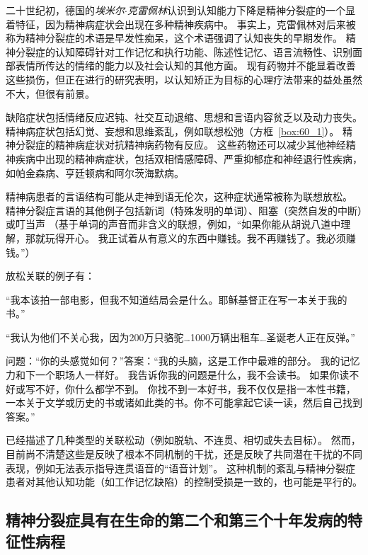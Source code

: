 二十世纪初，德国的\textit{埃米尔$\cdot$克雷佩林}认识到认知能力下降是精神分裂症的一个显着特征，因为精神病症状会出现在多种精神疾病中。
事实上，克雷佩林对后来被称为精神分裂症的术语是早发性痴呆，这个术语强调了认知丧失的早期发作。
精神分裂症的认知障碍针对工作记忆和执行功能、陈述性记忆、语言流畅性、识别面部表情所传达的情绪的能力以及社会认知的其他方面。
现有药物并不能显着改善这些损伤，但正在进行的研究表明，以认知矫正为目标的心理疗法带来的益处虽然不大，但很有前景。


缺陷症状包括情绪反应迟钝、社交互动退缩、思想和言语内容贫乏以及动力丧失。
精神病症状包括幻觉、妄想和思维紊乱，例如联想松弛（方框~\ref{box:60_1}）。
精神分裂症的精神病症状对抗精神病药物有反应。
这些药物还可以减少其他神经精神疾病中出现的精神病症状，包括双相情感障碍、严重抑郁症和神经退行性疾病，如帕金森病、亨廷顿病和阿尔茨海默病。


\begin{proposition}[思维障碍] \label{box:60_1}
	
	\quad \quad 精神病患者的言语结构可能从走神到语无伦次，这种症状通常被称为联想放松。
	精神分裂症言语的其他例子包括新词（特殊发明的单词）、阻塞（突然自发的中断）或叮当声
	（基于单词的声音而非含义的联想，例如，“如果你能从胡说八道中理解，那就玩得开心。
	我正试着从有意义的东西中赚钱。我不再赚钱了。我必须赚钱。”）
	
	放松关联的例子有：
	
	“我本该拍一部电影，但我不知道结局会是什么。耶稣基督正在写一本关于我的书。”
	
	“我认为他们不关心我，因为200万只骆驼…1000万辆出租车…圣诞老人正在反弹。”
	
	问题：“你的头感觉如何？”答案：“我的头脑，这是工作中最难的部分。
	我的记忆力和下一个职场人一样好。
	我告诉你我的问题是什么，我不会读书。
	如果你读不好或写不好，你什么都学不到。
	你找不到一本好书，我不仅仅是指一本性书籍，一本关于文学或历史的书或诸如此类的书。你不可能拿起它读一读，然后自己找到答案。”
	
	已经描述了几种类型的关联松动（例如脱轨、不连贯、相切或失去目标）。
	然而，目前尚不清楚这些是反映了根本不同机制的干扰，还是反映了共同潜在干扰的不同表现，例如无法表示指导连贯语音的“语音计划”。
	这种机制的紊乱与精神分裂症患者对其他认知功能（如工作记忆缺陷）的控制受损是一致的，也可能是平行的。

\end{proposition}




\subsection{精神分裂症具有在生命的第二个和第三个十年发病的特征性病程}

